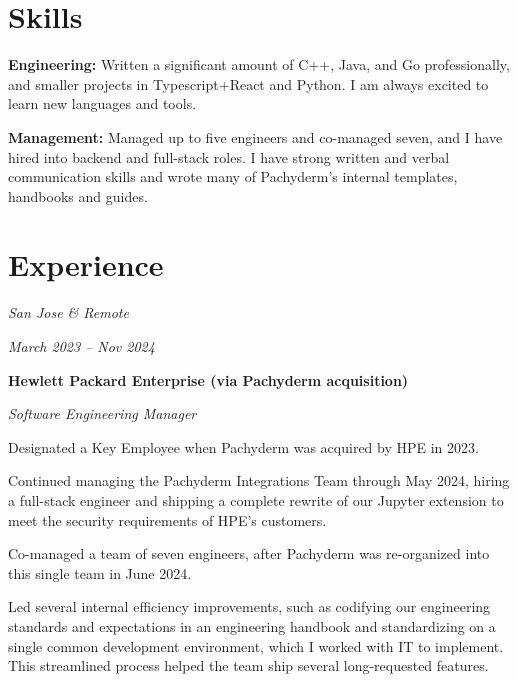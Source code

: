 \documentclass[10pt, letterpaper]{article}
\begin{document}
\section{Skills}

\begin{onecolentry}
    \begin{highlights}
        \item\textbf{Engineering:} Written a significant amount of C++, Java, and Go professionally, and smaller projects in Typescript+React and Python. I am always excited to learn new languages and tools.
        \item\textbf{Management:} Managed up to five engineers and co-managed seven, and I have hired into backend and full-stack roles. I have strong written and verbal communication skills and wrote many of Pachyderm's internal templates, handbooks and guides.
    \end{highlights}
\end{onecolentry}

\section{Experience}

\begin{twocolentry}{
    \textit{San Jose \& Remote}

    \textit{March 2023 – Nov 2024}
}
    \textbf{Hewlett Packard Enterprise (via Pachyderm acquisition)}

    \textit{Software Engineering Manager}
\end{twocolentry}

\vspace{0.1 cm}

\begin{onecolentry}
    \begin{highlights}
        \item Designated a Key Employee when Pachyderm was acquired by HPE in 2023.
        \item Continued managing the Pachyderm Integrations Team through May 2024, hiring a full-stack engineer and shipping a complete rewrite of our Jupyter extension to meet the security requirements of HPE's customers.
        \item Co-managed a team of seven engineers, after Pachyderm was re-organized into this single team in June 2024.
        \item Led several internal efficiency improvements, such as codifying our engineering standards and expectations in an engineering handbook and standardizing on a single common development environment, which I worked with IT to implement. This streamlined process helped the team ship several long-requested features.
    \end{highlights}
\end{onecolentry}
\end{document}
